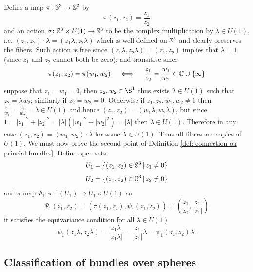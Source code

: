 \documentclass{article}
\theoremstyle{definition}
\theoremstyle{remark}
\begin{document}
Define a map \(\pi\colon\mathbb{S}^3\to\mathbb{S}^2\) by
\[\pi(z_1,z_2)=\frac{z_1}{z_2}\]
and an action \(\sigma\colon \mathbb{S}^3\times U(1)\to \mathbb{S}^3\) to be the complex multiplication by \(\lambda\in U(1)\), i.e. \((z_1,z_2)\cdot \lambda=(z_1\lambda,z_2\lambda)\) which is well defined on \(\mathbb{S}^3\) and clearly preserves the fibers.
Such action is free since \((z_1\lambda,z_2\lambda)=(z_1,z_2)\) implies that \(\lambda=1\) (since \(z_1\text{ and }z_2\) cannot both be zero); and transitive since
\[\pi(z_1,z_2)=\pi(w_1,w_2) \quad \iff \quad \frac{z_1}{z_2}=\frac{w_1}{w_2}\in\mathbb{C}\cup\{\infty\}\]
suppose that \(z_1=w_1=0\), then \(z_2,w_2\in\S^1\) thus exists \(\lambda\in U(1)\) such that \(z_2=\lambda w_2\); similarly if \(z_2=w_2=0\). Otherwise if \(z_1,z_2,w_1,w_2\not =0\) then \(\frac{z_1}{w_1}=\frac{z_2}{w_2}=\lambda\in U(1)\) and hence \((z_1,z_2)=(w_1\lambda,w_2\lambda)\), but since \(1=|z_1|^2+|z_2|^2=|\lambda|(|w_1|^2+|w_2|^2)=|\lambda|\) then \(\lambda\in U(1)\). Therefore in any case \((z_1,z_2)=(w_1,w_2)\cdot \lambda\) for some \(\lambda\in U(1)\). Thus all fibers are copies of \(U(1)\).
We must now prove the second point of Definition \ref{def: connection on princial bundles}. Define open sets
\[U_1=\{(z_1,z_2)\in\mathbb{S}^3\,|\,z_1\not =0\}\]
\[U_2=\{(z_1,z_2)\in\mathbb{S}^3\,|\,z_2\not =0\}\]
and a map \(\Psi_1\colon\pi^{-1}(U_1)\to U_1\times U(1)\) as
\[\Psi_1(z_1,z_2)=\left(\pi(z_1,z_2),\psi_1(z_1,z_2)\right)=\left(\frac{z_1}{z_2},\frac{z_1}{|z_1|}\right)\]
it satisfies the equivariance condition for all \(\lambda\in U(1)\)
\[\psi_1(z_1\lambda,z_2\lambda)=\frac{z_1\lambda}{|z_1\lambda|}=\frac{z_1}{|z_1|}\lambda=\psi_1(z_1,z_2)\lambda.\]

\subsection{Classification of bundles over spheres}
\end{document}
